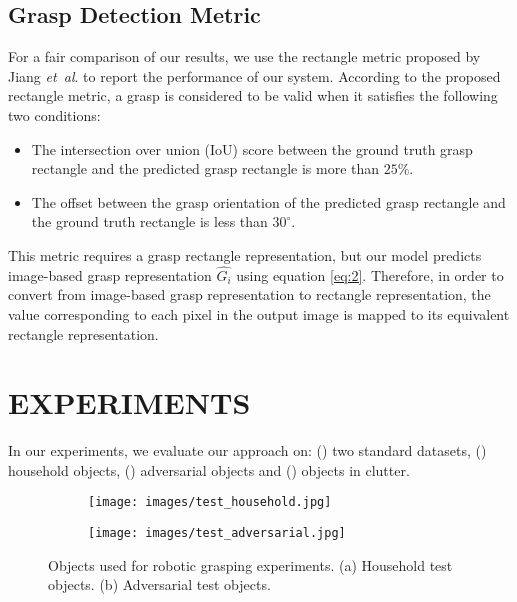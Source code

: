 \documentclass[letterpaper, 10pt, conference]{IEEEtran}
\newcommand{\etal}{\textit{et~al}. }
\begin{document}
\subsection{Grasp Detection Metric}
For a fair comparison of our results, we use the rectangle metric \cite{jiang2011efficient} proposed by Jiang \etal to report the performance of our system. According to the proposed rectangle metric, a grasp is considered to be valid when it satisfies the following two conditions:
\begin{itemize}
    \item The intersection over union (IoU) score between the ground truth grasp rectangle and the predicted grasp rectangle is more than $25\%$.
    \item The offset between the grasp orientation of the predicted grasp rectangle and the ground truth rectangle is less than $30^{\circ}$.
\end{itemize}

This metric requires a grasp rectangle representation, but our model predicts image-based grasp representation $\widehat{G_i}$ using equation \ref{eq:2}. Therefore, in order to convert from image-based grasp representation to rectangle representation, the value corresponding to each pixel in the output image is mapped to its equivalent rectangle representation.



\section{EXPERIMENTS}
In our experiments, we evaluate our approach on: () two standard datasets, () household objects, () adversarial objects and () objects in clutter.




\begin{figure}
\vspace*{0.1cm}
\begin{subfigure}{.24\textwidth}
  \centering
  \texttt{[image: images/test\_household.jpg]}  
  \caption{}
  \label{fig:household_objects}
\end{subfigure}
\begin{subfigure}{.24\textwidth}
  \centering
  \texttt{[image: images/test\_adversarial.jpg]}  
  \caption{}
  \label{fig:adversarial_objects}
\end{subfigure}
\caption{Objects used for robotic grasping experiments. (a) Household test objects. (b) Adversarial test objects.}
\label{fig:test_objects}
\end{figure}
\end{document}
